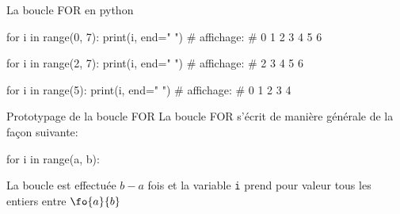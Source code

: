 	\begin{easybox}{La boucle FOR en python}
		\begin{minipage}[b]{0.33\linewidth}
	\begin{CodePythontexAlt}[Largeur=1\linewidth,Centre,PremLigne=1,Lignes=false,]{}
for i in range(0, 7):
	print(i, end=" ")
# affichage: 
# 0 1 2 3 4 5 6
	
				\end{CodePythontexAlt}
		\end{minipage}\hfill
		\begin{minipage}[b]{0.33\linewidth}
	\begin{CodePythontexAlt}[Largeur=1\linewidth,Centre,PremLigne=1,Lignes=false,]{}
for i in range(2, 7):
	print(i, end=" ")
# affichage: 
# 2 3 4 5 6
					
				\end{CodePythontexAlt}
		\end{minipage}\hfill
		 \begin{minipage}[b]{0.33\linewidth}
	\begin{CodePythontexAlt}[Largeur=1\linewidth,Centre,PremLigne=1,Lignes=false,]{}
for i in range(5):
	print(i, end=" ")
# affichage: 
# 0 1 2 3 4
	
				\end{CodePythontexAlt}
		\end{minipage}
	\end{easybox}
	
	
	\begin{easybox}{Prototypage de la boucle FOR}
	La boucle FOR s'écrit de manière générale de la façon suivante:
	
	\medskip
	
	\begin{minipage}[b]{0.4\linewidth}
	\begin{CodePythontexAlt}[Largeur=1\linewidth,Centre,PremLigne=1,Lignes=false,]{}
		for i in range(a, b):
	\end{CodePythontexAlt}
	\end{minipage}\hfill
	\begin{minipage}[b]{0.58\linewidth}
	La boucle est effectuée $b-a$ fois et la variable \verb+i+ prend pour valeur tous les entiers entre $\fo{a}{b}$
	\end{minipage}
	
	
	\end{easybox}
	

